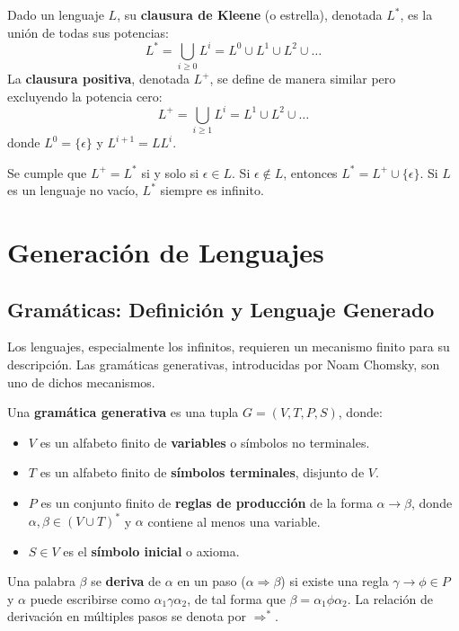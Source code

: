 \begin{definicion}
Dado un lenguaje $L$, su \textbf{clausura de Kleene} (o estrella), denotada $L^*$, es la unión de todas sus potencias:
\[ L^* = \bigcup_{i \geq 0} L^i = L^0 \cup L^1 \cup L^2 \cup \dots \]
La \textbf{clausura positiva}, denotada $L^+$, se define de manera similar pero excluyendo la potencia cero:
\[ L^+ = \bigcup_{i \geq 1} L^i = L^1 \cup L^2 \cup \dots \]
donde $L^0 = \{\epsilon\}$ y $L^{i+1} = L L^i$.
\end{definicion}
Se cumple que $L^+ = L^*$ si y solo si $\epsilon \in L$. Si $\epsilon \notin L$, entonces $L^* = L^+ \cup \{\epsilon\}$. Si $L$ es un lenguaje no vacío, $L^*$ siempre es infinito.

\section{Generación de Lenguajes}

\subsection{Gramáticas: Definición y Lenguaje Generado}
Los lenguajes, especialmente los infinitos, requieren un mecanismo finito para su descripción. Las gramáticas generativas, introducidas por Noam Chomsky, son uno de dichos mecanismos.

\begin{definicion}
Una \textbf{gramática generativa} es una tupla $G = (V, T, P, S)$, donde:
\begin{itemize}
    \item $V$ es un alfabeto finito de \textbf{variables} o símbolos no terminales.
    \item $T$ es un alfabeto finito de \textbf{símbolos terminales}, disjunto de $V$.
    \item $P$ es un conjunto finito de \textbf{reglas de producción} de la forma $\alpha \rightarrow \beta$, donde $\alpha, \beta \in (V \cup T)^*$ y $\alpha$ contiene al menos una variable.
    \item $S \in V$ es el \textbf{símbolo inicial} o axioma.
\end{itemize}
\end{definicion}

Una palabra $\beta$ se \textbf{deriva} de $\alpha$ en un paso ($\alpha \Rightarrow \beta$) si existe una regla $\gamma \rightarrow \phi \in P$ y $\alpha$ puede escribirse como $\alpha_1\gamma\alpha_2$, de tal forma que $\beta = \alpha_1\phi\alpha_2$. La relación de derivación en múltiples pasos se denota por $\Rightarrow^*$.

